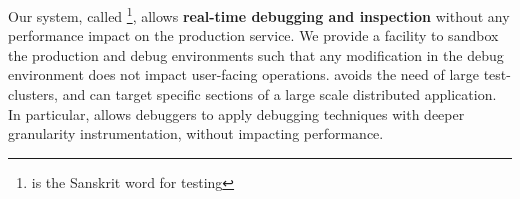 



Our system, called \parikshan\footnote{\parikshan is the Sanskrit word for  testing}, allows \textbf{real-time debugging and inspection} without any performance impact on the production service. 
We provide a facility to sandbox the production and debug environments such that any modification in the debug environment does not impact user-facing operations.
\parikshan avoids the need of large test-clusters, and can target specific sections of a large scale distributed application.
In particular, \parikshan allows debuggers to apply debugging techniques with deeper granularity instrumentation,  without impacting performance.

